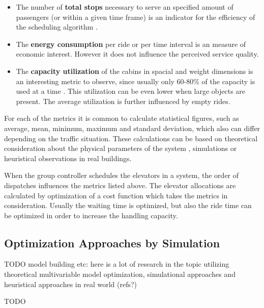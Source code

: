 \begin{itemize}
    \item The number of \textbf{total stops}
        necessary to serve an specified amount of passengers (or within a given time frame) is an indicator for the efficiency of the scheduling algorithm
        \autocite[][p.~194]{unger2015aufzuege}.
    
    \item The \textbf{energy consumption} 
        per ride or per time interval is an measure of economic interest. 
        However it does not influence the perceived service quality.
    
    \item The \textbf{capacity utilization} 
        of the cabins in spacial and weight dimensions is an interesting metric to observe, 
        since usually only 60-80\% of the capacity is used at a time 
        \autocite[][p.~194]{unger2015aufzuege}
        \autocite[][p.~7]{hakonen2003simulation}.
        This utilization can be even lower when large objects are present.
        The average utilization is further influenced by empty rides.
        
\end{itemize}

For each of the metrics it is common to calculate statistical figures, such as average, mean, minimum, maximum and standard deviation, which also can differ depending on the traffic situation.
These calculations can be based on theoretical consideration about the physical parameters of the system \autocite[][p.~194]{unger2015aufzuege}, simulations or heuristical observations in real buildings.
 
When the group controller schedules the elevators in a system, the order of dispatches influences the metrics listed above.
The elevator allocations are calculated by optimization of a cost function which takes the metrics in consideration.
Usually the waiting time is optimized, but also the ride time can be optimized in order to increase the handling capacity. \autocite[][p.~10]{siikonen1997models} 

\subsection{Optimization Approaches by Simulation}
TODO
model building etc: here is a lot of research in the topic utilizing theoretical multivariable model optimization, simulational approaches and heuristical approaches in real world (refs?)

\autocite[][pp.~7--11]{beers2015arrivals}
\autocite[][p.~193]{unger2015aufzuege}


TODO
